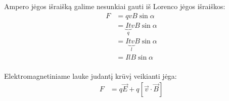 \begin{note}
  Ampero jėgos išraišką galime nesunkiai gauti iš Lorenco jėgos
  išraiškos:
  \begin{align*}
    F
    &= q v B \sin \alpha \\
    &= \underbrace{I t}_{q} v B \sin \alpha \\
    &= I \underbrace{t v}_{l} B \sin \alpha \\
    &= I l B \sin \alpha \\
  \end{align*}
\end{note}

Elektromagnetiniame lauke judantį krūvį veikianti jėga:
\begin{align*}
  F &= q \vec{E} + q \left[ \vec{v} \cdot \vec{B} \right]
\end{align*}

